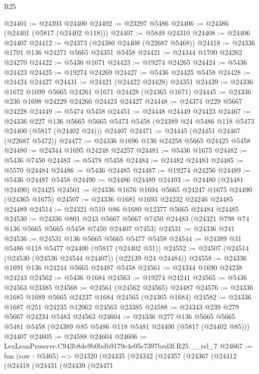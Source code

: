 \begin{lexlean}{R25}
\begin{coremodule}
@24401 := @24393 @24400
@24402 := @23297 @5486
@24406 := @24386 (@24401 (@5817 (@24402 @118)))
@24407 := @5849 @24310
@24408 := @24406 @24407
@24412 := @24373 (@24380 @24408 (@22687 @5468))
@24418 := @24336 @1701 @136 @24271 @5665 @24351 @5458
@24421 := @24344 @1700 @24262 @24270
@24422 := @5436 @1671
@24423 := @19274 @24265
@24424 := @5436 @24423
@24425 := @19274 @24269
@24427 := @5436 @24425 @5458
@24428 := @24424 @24427
@24431 := @24421 (@24422 @24428) @24351
@24439 := @24336 @1672 @1699 @5665 @24261 @1671 @24428 (@24365 @1671)
@24445 := @24336 @230 @1698 @24229 @24260 @24423 @24427
@24448 := @24374 @229 @5667 @24228
@24449 := @5474 @5458
@24451 := @24448 @24449 @24423
@24467 := @24336
    @227
    @136
    @5665
    @5665
    @5473
    @5458
    (@24389 @24 @5486 @118 @5473 @24400 (@5817 (@24402 @24)))
    @24407
@24471 := @24445 (@24451 @24467 (@22687 @5472))
@24477 := @24336 @1696 @136 @24258 @5665 @24425 @5458
@24480 := @24344 @1695 @24248 @24257
@24481 := @5436 @1675
@24482 := @5436 @7450
@24483 := @5478 @5458
@24484 := @24482 @24483
@24485 := @5570 @24484
@24486 := @5436 @24485
@24487 := @19274 @24256
@24489 := @5436 @24487 @5458
@24490 := @24486 @24489
@24493 := @24480 (@24481 @24490) @24425
@24501 := @24336 @1676 @1694 @5665 @24247 @1675 @24490 (@24365 @1675)
@24507 := @24336 @1681 @1693 @24232 @24246 @24485 @24489
@24514 := @24321 @510 @86 @1680 @12377 @5665 @24484 @24485
@24530 := @24336
    @801
    @243
    @5667
    @5667
    @7450
    @24483
    (@24321 @798 @74 @136 @5665 @5665 @5458 @7450 @24407 @7453)
@24531 := @24336 @241
@24536 := @24531 @136 @5665 @5665 @5477 @5458
@24544 := @24389 @31 @5486 @118 @5477 @24400 (@5817 (@24402 @31))
@24552 := @24507 (@24514 (@24530 (@24536 @24544 @24407)) (@22139 @24 @24484))
@24558 := @24336 @1691 @136 @24244 @5665 @24487 @5458
@24561 := @24344 @1690 @24238 @24243
@24562 := @5436 @1684
@24563 := @19274 @24241
@24565 := @5436 @24563 @23385
@24568 := @24561 (@24562 @24565) @24487
@24576 := @24336 @1685 @1689 @5665 @24237 @1684 @24565 (@24365 @1684)
@24582 := @24336 @1687 @251 @24235 @12062 @24563 @23385
@24588 := @24343 @239 @279 @5667 @24234 @5483 @24563
@24604 := @24336
    @277
    @136
    @5665
    @5665
    @5481
    @5458
    (@24389 @85 @5486 @118 @5481 @24400 (@5817 (@24402 @85)))
    @24407
@24605 := @24588 @24604
@24606 := LexLeanPreserve.C943b8de9b0bdb9179c4e05c7397bed3f.R25.__rel_7
@24667 := fun (row : @5465) =>
  @24320
    (@24335
      (@24342
        (@24357
          (@24367
            (@24412
              (@24418
                (@24431
                  (@24439
                    (@24471

\end{coremodule}
\end{lexlean}
